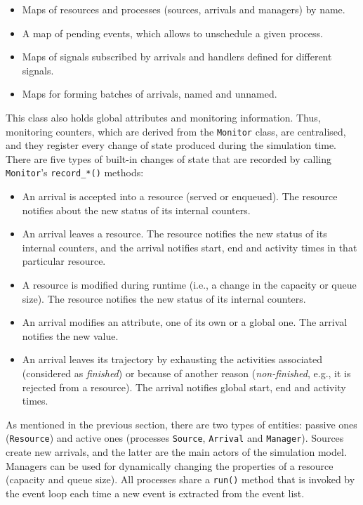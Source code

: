 \documentclass[twoside,nohyper]{tufte-book}
\providecommand{\tightlist}{%
  \setlength{\itemsep}{0pt}\setlength{\parskip}{0pt}}
\begin{document}
\begin{itemize}
\tightlist
\item
  Maps of resources and processes (sources, arrivals and managers) by name.
\item
  A map of pending events, which allows to unschedule a given process.
\item
  Maps of signals subscribed by arrivals and handlers defined for different signals.
\item
  Maps for forming batches of arrivals, named and unnamed.
\end{itemize}

This class also holds global attributes and monitoring information. Thus, monitoring counters, which are derived from the \texttt{Monitor} class, are centralised, and they register every change of state produced during the simulation time. There are five types of built-in changes of state that are recorded by calling \texttt{Monitor}'s \texttt{record\_*()} methods:

\begin{itemize}
\tightlist
\item
  An arrival is accepted into a resource (served or enqueued). The resource notifies about the new status of its internal counters.
\item
  An arrival leaves a resource. The resource notifies the new status of its internal counters, and the arrival notifies start, end and activity times in that particular resource.
\item
  A resource is modified during runtime (i.e., a change in the capacity or queue size). The resource notifies the new status of its internal counters.
\item
  An arrival modifies an attribute, one of its own or a global one. The arrival notifies the new value.
\item
  An arrival leaves its trajectory by exhausting the activities associated (considered as \emph{finished}) or because of another reason (\emph{non-finished}, e.g., it is rejected from a resource). The arrival notifies global start, end and activity times.
\end{itemize}

As mentioned in the previous section, there are two types of entities: passive ones (\texttt{Resource}) and active ones (processes \texttt{Source}, \texttt{Arrival} and \texttt{Manager}). Sources create new arrivals, and the latter are the main actors of the simulation model. Managers can be used for dynamically changing the properties of a resource (capacity and queue size). All processes share a \texttt{run()} method that is invoked by the event loop each time a new event is extracted from the event list.
\end{document}
